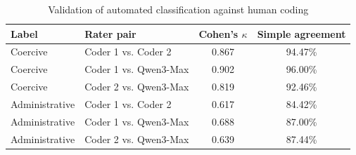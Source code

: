 \begin{table}[htbp]
\centering
\small
\caption{Validation of automated classification against human coding}
\label{tab:main-validation}
\begin{tabular}{llcc}
\toprule
Label & Rater pair & Cohen's $\kappa$ & Simple agreement \\
\midrule
Coercive & Coder 1 vs. Coder 2 & 0.867 & 94.47\% \\
Coercive & Coder 1 vs. Qwen3-Max & 0.902 & 96.00\% \\
Coercive & Coder 2 vs. Qwen3-Max & 0.819 & 92.46\% \\
\addlinespace
Administrative & Coder 1 vs. Coder 2 & 0.617 & 84.42\% \\
Administrative & Coder 1 vs. Qwen3-Max & 0.688 & 87.00\% \\
Administrative & Coder 2 vs. Qwen3-Max & 0.639 & 87.44\% \\
\bottomrule
\end{tabular}
\end{table}
